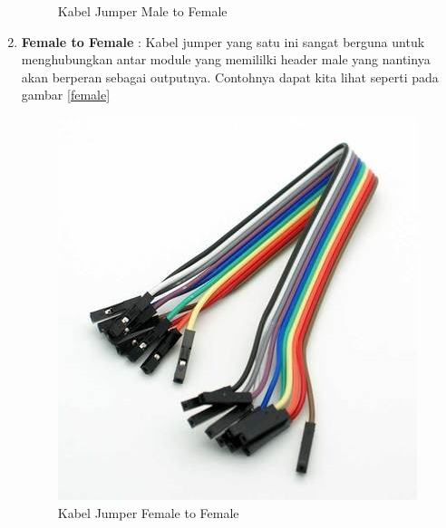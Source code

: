 \begin{enumerate}
\begin{figure}[!htbp]
\caption{Kabel Jumper Male to Female}\label{fig:mf}
\end{figure}
\item \textbf{Female to Female} :  Kabel jumper yang satu ini sangat berguna untuk menghubungkan antar module yang memililki header male yang nantinya akan berperan sebagai outputnya. Contohnya dapat kita lihat seperti pada gambar \ref{female} 
\begin{figure}[!htbp]
\centering
\includegraphics[width=.75\textwidth]{figures/CONV/female.jpg}
\caption{Kabel Jumper Female to Female}\label{fig:female}
\end{figure}
\end{enumerate}

